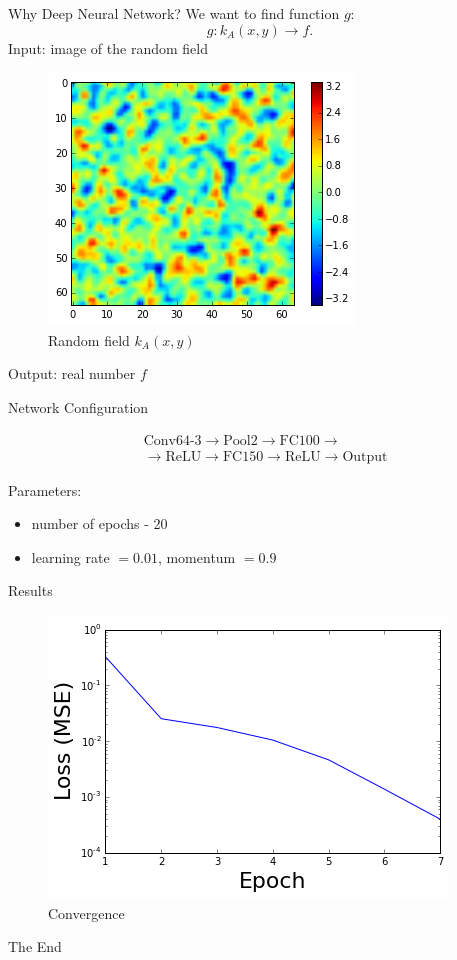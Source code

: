 \documentclass[12pt]{beamer}
\begin{document}
\begin{frame}{Why Deep Neural Network?}
We want to find function $g$:
\[
g: k_A(x, y) \rightarrow f.
\]
Input: image of the random field

\begin{figure}[!ht]
\includegraphics[scale=0.4]{rand_field1e-3.png}
\caption{Random field $k_A(x, y)$}
\end{figure}

Output: real number $f$
\end{frame}

\begin{frame}{Network Configuration}

\begin{equation*}
\begin{split}
& \text{Conv64-3} \rightarrow \text{Pool2} \rightarrow \text{FC100} \rightarrow \\ 
& \rightarrow \text{ReLU} \rightarrow \text{FC150} \rightarrow \text{ReLU} \rightarrow \text{Output}
\end{split}
\end{equation*}

Parameters: 
\begin{itemize}
\item number of epochs - 20\\
\item learning rate $= 0.01$, momentum $=0.9$
\end{itemize}
\end{frame}

\begin{frame}{Results}

\begin{figure}[!ht]
\centering
\includegraphics[scale=0.5]{convergence.png}
\caption{Convergence}
\end{figure}
\end{frame}

\begin{frame}
\begin{center}
\LARGE The End
\end{center}

\end{frame}
\end{document}
